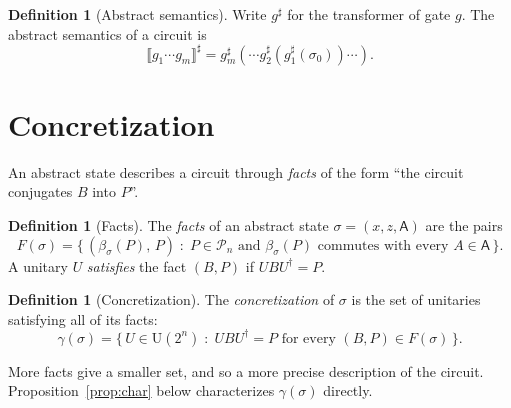 \documentclass[11pt]{article}
\theoremstyle{definition}
\newtheorem{definition}[theorem]{Definition}
\theoremstyle{remark}
\newcommand{\Pauli}{\mathcal{P}_n}
\newcommand{\Unit}{\mathrm{U}(2^n)}
\newcommand{\abs}[1]{\llbracket #1 \rrbracket^{\sharp}}
\newcommand{\adj}{^{\dagger}}
\newcommand{\gam}{\gamma}
\newcommand{\Ax}{\mathsf{A}}
\newcommand{\back}{\beta}
\begin{document}
\begin{definition}[Abstract semantics]
Write $g^\sharp$ for the transformer of gate $g$. The abstract semantics of a circuit is
\[
  \abs{g_1 \cdots g_m} = g_m^\sharp(\cdots g_2^\sharp(g_1^\sharp(\sigma_0))\cdots).
\]
\end{definition}

\section{Concretization}

An abstract state describes a circuit through \emph{facts} of the form ``the circuit
conjugates $B$ into $P$''.

\begin{definition}[Facts]
The \emph{facts} of an abstract state $\sigma = (x, z, \Ax)$ are the pairs
\[
  F(\sigma) = \bigl\{\, (\back_\sigma(P),\, P) \;:\; P \in \Pauli \text{ and }
  \back_\sigma(P) \text{ commutes with every } A \in \Ax \,\bigr\}.
\]
A unitary $U$ \emph{satisfies} the fact $(B, P)$ if $U B U\adj = P$.
\end{definition}

\begin{definition}[Concretization]
The \emph{concretization} of $\sigma$ is the set of unitaries satisfying all of its facts:
\[
  \gam(\sigma) = \bigl\{\, U \in \Unit \;:\; U B U\adj = P \text{ for every } (B, P) \in F(\sigma) \,\bigr\}.
\]
\end{definition}

More facts give a smaller set, and so a more precise description of the circuit.
Proposition~\ref{prop:char} below characterizes $\gam(\sigma)$ directly.
\end{document}
